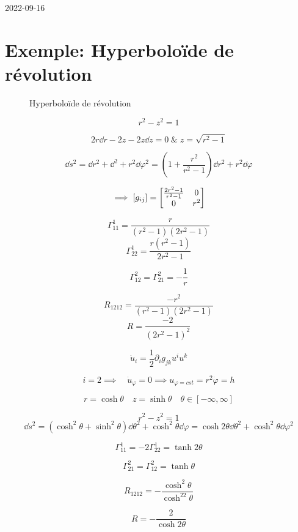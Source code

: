 


2022-09-16

\section*{Exemple: Hyperboloïde de révolution}


\begin{figure}[ht]
    \centering
    \caption{Hyperboloïde de révolution}
    \label{fig:hyperboloïde-de-révolution}
\end{figure}

$$r^2-z^{2}=1 $$ 

$$2r \dd r - 2z -2z \dd z = 0 \;\&\; z= \sqrt{r^2-1}$$ 


$$\dd s^{2}= \dd r^{2}+\dd^{2}+ r^{2}\dd \varphi^{2} =  \left( 1 + \frac{r^2}{r^{2}-1}  \right) \dd r^{2}+ r^{2}\dd \varphi$$ 

$$\implies [g_{ij} ] = \mqty[\frac{2r^{2}-1}{r^2-1} &0\\ 0 & r^2 ]$$ 

$$\Gamma_{11}^{1} = \frac{ r}{\left( r^2-1 \right) (2r^{2}-1)} $$ 
$$\Gamma_{22}^{1}= \frac{ r \left( r^2-1 \right) }{ 2r^2-1} $$ 

$$\Gamma_{12}^{2}= \Gamma_{21}^{2}= -\frac{1}{r} $$ 

$$R_{1212} = \frac{ -r^{2}}{ \left( r^{2}-1 \right) (2r^{2}-1)}  $$ 
$$R = \frac{ -2}{ \left( 2r^{2}-1 \right)^2 } $$ 

$$\dot u_i = \frac{1}{2} \partial_i g_{jk} u^{i}u^{k}$$ 

$$i=2 \implies \quad \dot u_{\varphi} = 0 \implies u_{\varphi=cst} = r^{2}\dot\varphi =h$$ 


\begin{tcolorbox}[title=Coordonnées hyperboliques ]

	$$r =\cosh\theta \quad z =\sinh\theta \quad \theta \in [-\infty,\infty]$$ 

	$$r^{2}-z^{2}=1$$ 
$$\dd s^{2}= \left( \cosh^{2}\theta + \sinh^{2}\theta  \right) \dd \theta^{2}+ \cosh^{2}\theta \dd \varphi = \cosh 2\theta \dd \theta^{2}+ \cosh^{2}\theta \dd \varphi^2$$ 

$$\Gamma_{11}^{1}= -2 \Gamma_{22}^{1}= \tanh 2\theta$$ 

$$\Gamma_{21}^{2}= \Gamma_{12}^{2}=\tanh\theta $$ 

$$R_{1212} = - \frac{\cosh^2\theta}{\cosh^22\theta}  $$ 

$$R = - \frac{ 2 }{\cosh2\theta} $$ 
\end{tcolorbox}

